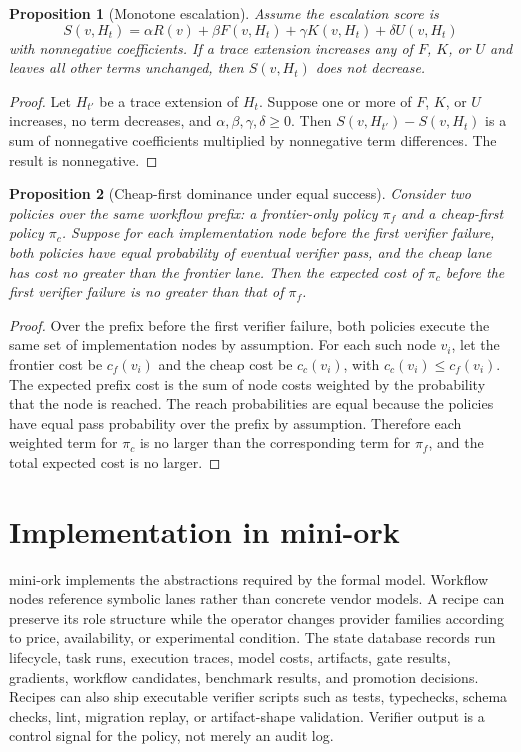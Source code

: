\documentclass[11pt]{article}
\newtheorem{proposition}{Proposition}
\begin{document}
\begin{proposition}[Monotone escalation]
Assume the escalation score is
\[
S(v,H_t)=\alpha R(v)+\beta F(v,H_t)+\gamma K(v,H_t)+\delta U(v,H_t)
\]
with nonnegative coefficients. If a trace extension increases any of $F$, $K$,
or $U$ and leaves all other terms unchanged, then $S(v,H_t)$ does not decrease.
\end{proposition}

\begin{proof}
Let $H_{t'}$ be a trace extension of $H_t$. Suppose one or more of $F$, $K$, or
$U$ increases, no term decreases, and $\alpha,\beta,\gamma,\delta\ge 0$. Then
$S(v,H_{t'})-S(v,H_t)$ is a sum of nonnegative coefficients multiplied by
nonnegative term differences. The result is nonnegative.
\end{proof}

\begin{proposition}[Cheap-first dominance under equal success]
Consider two policies over the same workflow prefix: a frontier-only policy
$\pi_f$ and a cheap-first policy $\pi_c$. Suppose for each implementation node
before the first verifier failure, both policies have equal probability of
eventual verifier pass, and the cheap lane has cost no greater than the
frontier lane. Then the expected cost of $\pi_c$ before the first verifier
failure is no greater than that of $\pi_f$.
\end{proposition}

\begin{proof}
Over the prefix before the first verifier failure, both policies execute the
same set of implementation nodes by assumption. For each such node $v_i$, let
the frontier cost be $c_f(v_i)$ and the cheap cost be $c_c(v_i)$, with
$c_c(v_i)\le c_f(v_i)$. The expected prefix cost is the sum of node costs
weighted by the probability that the node is reached. The reach probabilities
are equal because the policies have equal pass probability over the prefix by
assumption. Therefore each weighted term for $\pi_c$ is no larger than the
corresponding term for $\pi_f$, and the total expected cost is no larger.
\end{proof}

\section{Implementation in mini-ork}

mini-ork implements the abstractions required by the formal model. Workflow
nodes reference symbolic lanes rather than concrete vendor models. A recipe can
preserve its role structure while the operator changes provider families
according to price, availability, or experimental condition. The state database
records run lifecycle, task runs, execution traces, model costs, artifacts,
gate results, gradients, workflow candidates, benchmark results, and promotion
decisions. Recipes can also ship executable verifier scripts such as tests,
typechecks, schema checks, lint, migration replay, or artifact-shape
validation. Verifier output is a control signal for the policy, not merely an
audit log.
\end{document}
